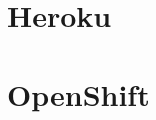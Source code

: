 \vspace*{0.2in}
\section{Heroku}\label{cap.3.1}

\vspace*{0.2in}
\section{OpenShift}\label{cap.3.2}
